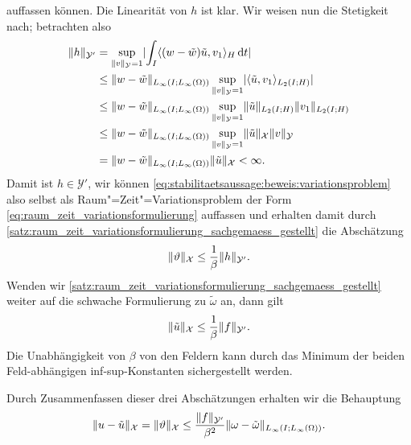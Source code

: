 \begin{Lemma}
\begin{Beweis}
\begin{equation}
        \end{equation}
        auffassen können.
        Die Linearität von $h$ ist klar.
        Wir weisen nun die Stetigkeit nach; betrachten also
        \begin{align}
            \lVert h\rVert_{\mathcal Y'}
            &= \sup_{\lVert v\rVert_{\mathcal Y} = 1} \lvert\int_{I} \langle(w - \tilde{w})\tilde{u},v_{1}\rangle_{H} \mathop{}\!\mathrm{d} t\rvert
            \\&\leq \lVert w - \tilde{w}\rVert_{L_{\infty}(I; L_{\infty}(\Omega))} \sup_{\lVert v\rVert_{\mathcal Y} = 1} \lvert\langle\tilde{u},v_{1}\rangle_{L_{2}(I; H)}\rvert
            \\&\leq \lVert w - \tilde{w}\rVert_{L_{\infty}(I; L_{\infty}(\Omega))} \sup_{\lVert v\rVert_{\mathcal Y} = 1} \lVert\tilde{u}\rVert_{L_{2}(I; H)} \lVert v_{1}\rVert_{L_{2}(I; H)}
            \\&\leq \lVert w - \tilde{w}\rVert_{L_{\infty}(I; L_{\infty}(\Omega))} \sup_{\lVert v\rVert_{\mathcal Y} = 1} \lVert\tilde{u}\rVert_{\mathcal X} \lVert v\rVert_{\mathcal Y}
            \\&= \lVert w - \tilde{w}\rVert_{L_{\infty}(I; L_{\infty}(\Omega))} \lVert\tilde{u}\rVert_{\mathcal X}
            < \infty.
        \end{align}
        Damit ist $h \in \mathcal Y'$, wir können \cref{eq:stabilitaetsaussage:beweis:variationsproblem} also selbst als Raum"=Zeit"=Variationsproblem der Form \cref{eq:raum_zeit_variationsformulierung} auffassen und erhalten damit durch \cref{satz:raum_zeit_variationsformulierung_sachgemaess_gestellt} die Abschätzung
        \begin{equation}
            \lVert\vartheta\rVert_{\mathcal X} \leq \frac{1}{\beta} \lVert h\rVert_{\mathcal Y'}.
        \end{equation}
        Wenden wir \cref{satz:raum_zeit_variationsformulierung_sachgemaess_gestellt} weiter auf die schwache Formulierung zu $\tilde{\omega}$ an, dann gilt
        \begin{equation}
            \lVert\tilde{u}\rVert_{\mathcal X} \leq \frac{1}{\beta} \lVert f\rVert_{\mathcal Y'}.
        \end{equation}
        Die Unabhängigkeit von $\beta$ von den Feldern kann durch das Minimum der beiden Feld-abhängigen inf-sup-Konstanten sichergestellt werden.

        Durch Zusammenfassen dieser drei Abschätzungen erhalten wir die Behauptung
        \begin{equation}
            \lVert u - \tilde{u}\rVert_{\mathcal X} = \lVert\vartheta\rVert_{\mathcal X} \leq \frac{\lVert f\rVert_{\mathcal Y'}}{\beta^{2}} \lVert\omega - \tilde{\omega}\rVert_{L_{\infty}(I; L_{\infty}(\Omega))}.
        \end{equation}
    \end{Beweis}
\end{Lemma}

